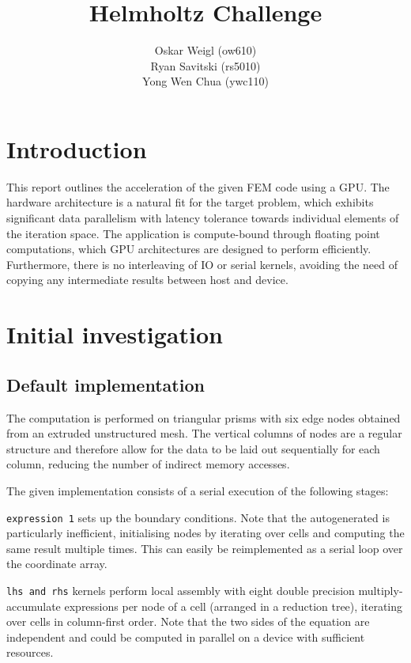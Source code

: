 \documentclass[11pt, oneside, a4paper]{article}
\date{}
\title{Helmholtz Challenge}
\author{
  \small{Oskar Weigl (ow610)}\\
  \small{Ryan Savitski (rs5010)}\\
  \small{Yong Wen Chua (ywc110)}
}
\begin{document}
\maketitle

\section{Introduction} %
\label{sec:introduction}

This report outlines the acceleration of the given FEM code using a GPU. The hardware architecture is a natural fit for the target problem, which exhibits significant data parallelism with latency tolerance towards individual elements of the iteration space. The application is compute-bound through floating point computations, which GPU architectures are designed to perform efficiently. Furthermore, there is no interleaving of IO or serial kernels, avoiding the need of copying any intermediate results between host and device.


\section{Initial investigation} %
\label{sec:initial_investigation}

\subsection{Default implementation} %
\label{sub:default_implementation}

The computation is performed on triangular prisms with six edge nodes obtained from an extruded unstructured mesh. The vertical columns of nodes are a regular structure and therefore allow for the data to be laid out sequentially for each column, reducing the number of indirect memory accesses.

The given implementation consists of a serial execution of the following stages: 

 \texttt{expression 1} sets up the boundary conditions. Note that the autogenerated is particularly inefficient, initialising nodes by iterating over cells and computing the same result multiple times. This can easily be reimplemented as a serial loop over the coordinate array.

\texttt{lhs and rhs} kernels perform local assembly with eight double precision multiply-accumulate expressions per node of a cell (arranged in a reduction tree), iterating over cells in column-first order. Note that the two sides of the equation are independent and could be computed in parallel on a device with sufficient resources.
\end{document}
